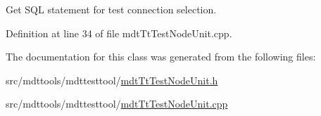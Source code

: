 Get S\-Q\-L statement for test connection selection. 



Definition at line 34 of file mdt\-Tt\-Test\-Node\-Unit.\-cpp.



The documentation for this class was generated from the following files\-:\begin{DoxyCompactItemize}
\item 
src/mdttools/mdttesttool/\hyperlink{mdt_tt_test_node_unit_8h}{mdt\-Tt\-Test\-Node\-Unit.\-h}\item 
src/mdttools/mdttesttool/\hyperlink{mdt_tt_test_node_unit_8cpp}{mdt\-Tt\-Test\-Node\-Unit.\-cpp}\end{DoxyCompactItemize}
